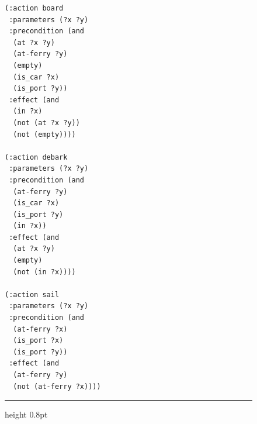 \begin{figure}[t]
\begin{minipage}[t]{0.33\textwidth}
\begin{lstlisting}
(:action board
 :parameters (?x ?y)
 :precondition (and
  (at ?x ?y)
  (at-ferry ?y)
  (empty)
  (is_car ?x)
  (is_port ?y))
 :effect (and
  (in ?x)
  (not (at ?x ?y))
  (not (empty))))

(:action debark
 :parameters (?x ?y)
 :precondition (and
  (at-ferry ?y)
  (is_car ?x)
  (is_port ?y)
  (in ?x))
 :effect (and
  (at ?x ?y)
  (empty)
  (not (in ?x))))

(:action sail
 :parameters (?x ?y)
 :precondition (and
  (at-ferry ?x)
  (is_port ?x)
  (is_port ?y))
 :effect (and
  (at-ferry ?y)
  (not (at-ferry ?x))))
\end{lstlisting}
\end{minipage}%
\par\vspace{0.6em}
\hrule height 0.8pt
\captionsetup{position=bottom}
\label{lst:ferry_full}
\end{figure}
\endgroup

